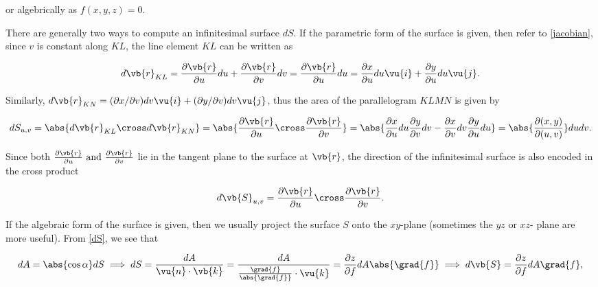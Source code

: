 \documentclass[english,a4paper,12pt]{report}
\begin{document}
or algebrically as \(f(x,y,z) = 0\). 

There are generally two ways to compute an infinitesimal surface \(dS\). If the parametric form of the surface is given, then refer to \cref{jacobian}, since \(v\) is constant along \(KL\), the line element \(KL\) can be written as 

\begin{equation}
	d\vb{r} _{KL} = \frac{\partial \vb{r} }{\partial u}du+ \frac{\partial \vb{r} }{\partial v}dv = \frac{\partial \vb{r} }{\partial u}du = \frac{\partial x}{\partial u} du \vu{i} + \frac{\partial y}{\partial u} du \vu{j}.
\end{equation}

Similarly, \(d\vb{r} _{KN}  = (\partial x / \partial v) dv \vu{i} + (\partial y/\partial v)dv \vu{j}\), thus the area of the parallelogram \(KLMN\) is given by

\begin{equation}
	dS_{u,v} = \abs{d\vb{r} _{KL} \cross  d\vb{r} _{KN}} = \abs{\frac{\partial \vb{r} }{\partial u} \cross \frac{\partial \vb{r} }{\partial v} } = \abs{\frac{\partial x}{\partial u} du \frac{\partial y}{\partial v} dv - \frac{\partial x}{\partial v} dv \frac{\partial y}{\partial u} du} = \abs{\frac{\partial (x,y)}{\partial (u,v)} } dudv.
\end{equation}

Since both \(\frac{\partial \vb{r} }{\partial u} \text { and } \frac{\partial \vb{r} }{\partial v}  \) lie in the tangent plane to the surface at \(\vb{r} \), the direction of the infinitesimal surface is also encoded in the cross product

\begin{equation}
	d\vb{S} _{u,v} = \frac{\partial \vb{r} }{\partial u} \cross \frac{\partial \vb{r} }{\partial v}.   
\end{equation}



If the algebraic form of the surface is given, then we usually project the surface \(S\) onto the \(xy\)-plane (sometimes the \(yz \text { or } xz\)- plane are more useful). From \cref{dS}, we see that 

\begin{equation} \label{dseq} 
	dA = \abs{\cos \alpha }dS \implies dS = \frac{dA}{\vu{n} \cdot \vb{k} } = \frac{dA}{\frac{\grad{f} }{\abs{\grad{f} } } \cdot \vu{k}  } =  \frac{\partial z}{\partial f}dA\abs{\grad{f} } \implies d\vb{S} = \frac{\partial z}{\partial f} dA\grad{f} , 
\end{equation}
\end{document}
